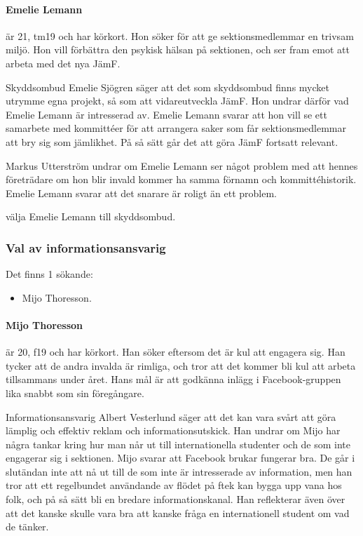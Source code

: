 \documentclass[hidelinks]{sektionsmote}
\begin{document}
\paragraph{Emelie Lemann} är 21, tm19 och har körkort.
Hon söker för att ge sektionsmedlemmar en trivsam miljö.
Hon vill förbättra den psykisk hälsan på sektionen, och ser fram emot att arbeta med det nya JämF.

Skyddsombud Emelie Sjögren säger att det som skyddsombud finns mycket utrymme egna projekt, så som att vidareutveckla JämF.
Hon undrar därför vad Emelie Lemann är intresserad av.
Emelie Lemann svarar att hon vill se ett samarbete med kommittéer för att arrangera saker som får sektionsmedlemmar att bry sig som jämlikhet.
På så sätt går det att göra JämF fortsatt relevant.

Markus Utterström undrar om Emelie Lemann ser något problem med att hennes företrädare om hon blir invald kommer ha samma förnamn och kommittéhistorik.
Emelie Lemann svarar att det snarare är roligt än ett problem.

\begin{beslut}
  \item välja Emelie Lemann till skyddsombud.
\end{beslut}

\subsubsection{Val av informationsansvarig}
Det finns 1 sökande:
\begin{itemize}
    \item Mijo Thoresson.
\end{itemize}

\paragraph{Mijo Thoresson} är 20, f19 och har körkort.
Han söker eftersom det är kul att engagera sig.
Han tycker att de andra invalda är rimliga, och tror att det kommer bli kul att arbeta tillsammans under året.
Hans mål är att godkänna inlägg i Facebook-gruppen lika snabbt som sin föregångare.

Informationsansvarig Albert Vesterlund säger att det kan vara svårt att göra lämplig och effektiv reklam och informationsutskick.
Han undrar om Mijo har några tankar kring hur man når ut till internationella studenter och de som inte engagerar sig i sektionen.
Mijo svarar att Facebook brukar fungerar bra.
De går i slutändan inte att nå ut till de som inte är intresserade av information, men han tror att ett regelbundet användande av flödet på ftek kan bygga upp vana hos folk, och på så sätt bli en bredare informationskanal.
Han reflekterar även över att det kanske skulle vara bra att kanske fråga en internationell student om vad de tänker.
\end{document}
